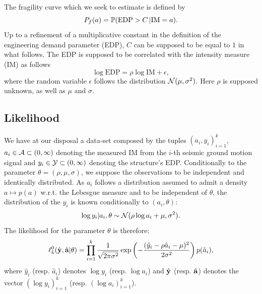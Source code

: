     The fragility curve which we seek to estimate is defined by
\begin{equation}
    P_f(a) = \mathbb{P}(\mathrm{EDP}>C\,|\mathrm{IM}=a).
\end{equation}
Up to a refinement of a multiplicative constant in the definition of the engineering demand parameter (EDP), $C$ can be supposed to be equal to $1$ in what follows.
The EDP is supposed to be correlated with the intensity measure (IM) as follows
\begin{equation}
    \log \mathrm{EDP} = \rho\log \mathrm{IM} + \epsilon ,
\end{equation}
where the random variable $\epsilon$ follows 
the distribution $\mathcal{N}(\mu,\sigma^2)$.
Here $\rho$ is supposed unknown, as well as $\mu$ and $\sigma$. 




    
    \subsection{Likelihood}\label{lowdoe:sec:likelihood}

We have at our disposal a data-set composed by the tuples $(a_i,y_i)_{i=1}^k$, $a_i\in\mathcal{A}\subset(0,\infty)$ denoting the measured IM from {the $i$-th seismic ground motion} signal and $y_i\in\mathcal{Y}\subset(0,\infty)$ denoting the structure's EDP. Conditionally to the parameter $\theta=(\rho,\mu,\sigma)$, we suppose the observations to be independent and identically distributed. As $a_i$ follows a distribution assumed to admit a density $a\mapsto p(a)$ w.r.t.{ }the Lebesgue measure and to be independent of $\theta$, the distribution of the $y_i$ is known conditionally to $(a_i,\theta)$:
    \begin{equation}
        \log y_i|a_i,\theta \sim \mathcal{N}(\rho\log a_i+\mu,\sigma^2)    .
    \end{equation}
The likelihood for the parameter $\theta$ is therefore:
    \begin{equation}
        \ell_k^0(\hat{\mathbf{y}},\hat{\mathbf{a}}|\theta) = \prod_{i=1}^k \frac{1}{\sqrt{2\pi\sigma^2}}\exp\left( -\frac{(\hat y_i-\rho\hat a_i-\mu)^2}{2\sigma^2} \right)p(\hat a_i),
    \end{equation}
where $\hat y_i$ (resp. $\hat a_i$) denotes $\log y_i$ (resp. $\log a_i$) and $\hat{\mathbf{y}}$ (resp. $\hat{\mathbf{a}}$) denotes the vector $(\log y_i)_{i=1}^k$ (resp. $(\log a_i)_{i=1}^k$).

